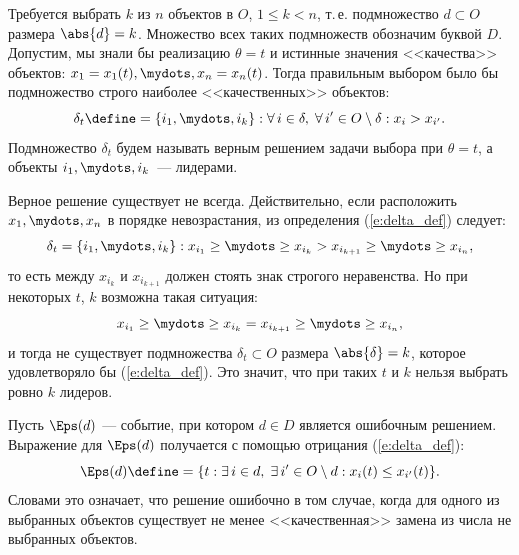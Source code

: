 Требуется выбрать $k$ из $n$ объектов в $O$, $1 \leq k < n$, т.\,е. подмножество $d \subset O$ размера $\abs{d} = k$. Множество всех таких подмножеств обозначим буквой $D$. Допустим, мы знали бы реализацию $\theta = t$ и истинные значения <<качества>> объектов: $x_1 = x_1(t), \mydots, x_n = x_n(t)$. Тогда правильным выбором было бы подмножество строго наиболее <<качественных>> объектов:
\begin{equation}
    \label{e:delta_def}
    \delta_{t} \define= \{i_1, \mydots, i_k\}: \forall\, i \in \delta,\; \forall\, i' \in O \setminus \delta: x_i > x_{i'}. 
\end{equation}
Подмножество $\delta_{t}$ будем называть верным решением задачи выбора при $\theta = t$, а объекты $i_1, \mydots, i_k$~--- лидерами. %

Верное решение существует не всегда. Действительно, если расположить $x_1, \mydots, x_n$ в порядке невозрастания, из определения (\ref{e:delta_def}) следует:
\begin{equation}
   \label{e:right_order_strict}
    \delta_t = \{i_1, \mydots, i_k\}: x_{i_1} \geq \mydots \geq x_{i_k} > x_{i_{k+1}} \geq \mydots \geq x_{i_n},   
\end{equation}
то есть между $x_{i_k}$ и $x_{i_{k+1}}$ должен стоять знак строгого неравенства. Но при некоторых $t$, $k$ возможна такая ситуация:
\begin{equation}
    \label{e:right_order_fail}
    x_{i_1} \geq \mydots \geq x_{i_k} = x_{i_{k+1}} \geq \mydots \geq x_{i_n},    
\end{equation}
и тогда не существует подмножества $\delta_t \subset O$ размера $\abs{\delta} = k$, которое  удовлетворяло бы (\ref{e:delta_def}). Это значит, что при таких $t$ и $k$ нельзя выбрать ровно $k$ лидеров. 

Пусть $\Eps(d)$ --- событие, при котором $d \in D$ является ошибочным решением. Выражение для $\Eps(d)$ получается с помощью отрицания (\ref{e:delta_def}):
\begin{equation}
  \label{e:Eps_d_def}
  \Eps(d) \define= \{t: \exists\, i \in d,\; \exists\, i' \in O \setminus d: x_i(t) \leq x_{i'}(t)\}.
\end{equation}
Словами это означает, что решение ошибочно в том случае, когда для одного из выбранных объектов существует не менее <<качественная>> замена из числа не выбранных объектов.

